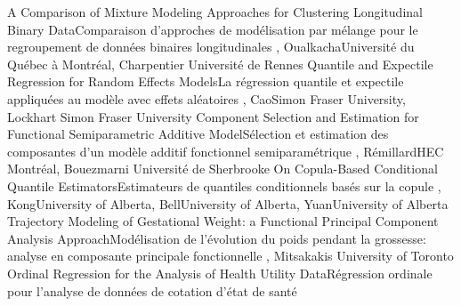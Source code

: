 {
}
{A Comparison of Mixture Modeling Approaches for Clustering Longitudinal Binary Data}{Comparaison d'approches de modélisation par mélange pour le regroupement de données binaires longitudinales}
{\bubbleE \enspace \screenE}
{
,  {Oualkacha}{Université du Québec à Montréal},  {Charpentier}
{Université de Rennes}
}
{Quantile and Expectile Regression for Random Effects Models}{La régression quantile et expectile appliquées au modèle avec effets aléatoires}
{\bubbleF \enspace \screenE}
{
,  {Cao}{Simon Fraser University},  {Lockhart}
{Simon Fraser University}
}
{Component Selection and Estimation for Functional Semiparametric Additive Model}{Sélection et estimation des composantes d’un modèle additif fonctionnel semiparamétrique}
{\bubbleE \enspace \screenE}
{
,  {Rémillard}{HEC Montréal},  {Bouezmarni}
{Université de Sherbrooke}
}
{On Copula-Based Conditional Quantile Estimators}{Estimateurs de quantiles conditionnels basés sur la copule}
{\bubbleE \enspace \screenE}
{
,  {Kong}{University of Alberta},  {Bell}{University of Alberta},  {Yuan}{University of Alberta}
}
{Trajectory Modeling of Gestational Weight: a Functional Principal Component Analysis Approach}{Modélisation de l’évolution du poids pendant la grossesse: analyse en composante principale fonctionnelle}
{\bubbleE \enspace \screenE}
{
,  {Mitsakakis}
{University of Toronto}
}
{Ordinal Regression for the Analysis of Health Utility Data}{Régression ordinale pour l’analyse de données de cotation d'état de santé}
{\bubbleE \enspace \screenE}



